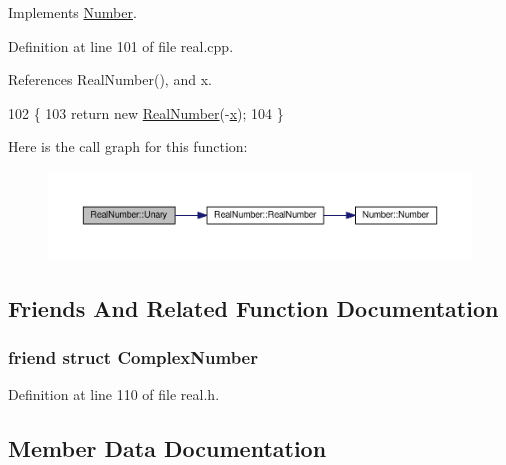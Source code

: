 Implements \hyperlink{structNumber_a4283e401f772614fc566db78087cf860}{Number}.



Definition at line 101 of file real.\+cpp.



References Real\+Number(), and x.


\begin{DoxyCode}
102 \{
103     \textcolor{keywordflow}{return} \textcolor{keyword}{new} \hyperlink{structRealNumber_aa61264f519c95ec9b63ab94c352bcc67}{RealNumber}(-\hyperlink{structRealNumber_ac33d80bee75448490199a0aa48ccce1e}{x});
104 \}
\end{DoxyCode}


Here is the call graph for this function\+:\nopagebreak
\begin{figure}[H]
\begin{center}
\leavevmode
\includegraphics[width=350pt]{structRealNumber_a0370c55b92e3ec36270a894918ae53ca_cgraph}
\end{center}
\end{figure}




\subsection{Friends And Related Function Documentation}
\subsubsection[{\texorpdfstring{Complex\+Number}{ComplexNumber}}]{\setlength{\rightskip}{0pt plus 5cm}friend struct {\bf Complex\+Number}\hspace{0.3cm}{\ttfamily [friend]}}\hypertarget{structRealNumber_ae59451cc698db2f80a85244883578673}{}\label{structRealNumber_ae59451cc698db2f80a85244883578673}


Definition at line 110 of file real.\+h.



\subsection{Member Data Documentation}
